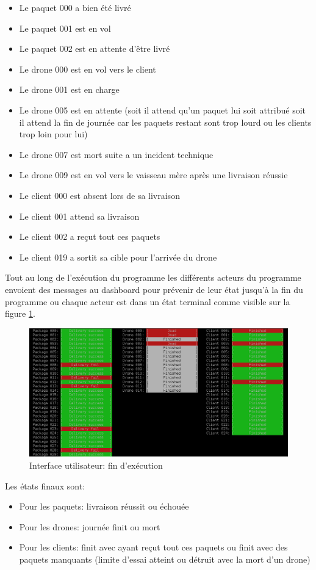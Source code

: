 \documentclass[article, backcover, french, nodocumentinfo]{upmethodology-document}
\begin{document}
					\begin{itemize}
						\item Le paquet 000 a bien été livré
						\item Le paquet 001 est en vol
						\item Le paquet 002 est en attente d’être livré
						\item Le drone 000 est en vol vers le client
						\item Le drone 001 est en charge
						\item Le drone 005 est en attente (soit il attend qu'un paquet lui soit attribué soit il attend la fin de journée car les paquets restant sont trop lourd ou les clients trop loin pour lui)
						\item Le drone 007 est mort suite a un incident technique
						\item Le drone 009 est en vol vers le vaisseau mère après une livraison réussie
						\item Le client 000 est absent lors de sa livraison
						\item Le client 001 attend sa livraison
						\item Le client 002 a reçut tout ces paquets
						\item Le client 019 a sortit sa cible pour l'arrivée du drone
					\end{itemize}
					Tout au long de l’exécution du programme les différents acteurs du programme envoient des messages au dashboard pour prévenir de leur état jusqu’à la fin du programme ou chaque acteur est dans un état terminal comme visible sur la figure \ref{fig:UIend}.
					\begin{figure}[H]
						\centering
						\includegraphics[width=\textwidth]{figures/UI2}
						\caption{Interface utilisateur: fin d’exécution}
						\label{fig:UIend}
					\end{figure}
					Les états finaux sont:
					\begin{itemize}
						\item Pour les paquets: livraison réussit ou échouée
						\item Pour les drones: journée finit ou mort
						\item Pour les clients: finit avec ayant reçut tout ces paquets ou finit avec des paquets manquants (limite d'essai atteint ou détruit avec la mort d'un drone)
					\end{itemize}
\end{document}
